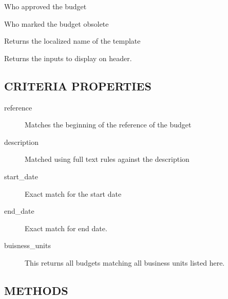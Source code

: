 \begin{description}
\begin{description}
\begin{description}
\begin{description}
\begin{description}
\begin{description}
\begin{description}
\begin{description}
\begin{description}
\begin{description}
\begin{description}
\begin{description}
Who approved the budget


\item[{obsolete\_by\_name}] \mbox{}

Who marked the budget obsolete

\end{description}

\item[{name}] \mbox{}

Returns the localized name of the template


\item[{header\_lines}] \mbox{}

Returns the inputs to display on header.

\end{description}
\subsection*{CRITERIA PROPERTIES\label{LedgerSMB::DBObject::Reports::Budget::Search_CRITERIA_PROPERTIES}}
\begin{description}

\item[{reference}] \mbox{}

Matches the beginning of the reference of the budget


\item[{description}] \mbox{}

Matched using full text rules against the description


\item[{start\_date}] \mbox{}

Exact match for the start date


\item[{end\_date}] \mbox{}

Exact match for end date.


\item[{buisness\_units}] \mbox{}

This returns all budgets matching all business units listed here.

\end{description}
\subsection*{METHODS\label{LedgerSMB::DBObject::Reports::Budget::Search_METHODS}}
\begin{description}


\end{description}
\end{description}
\end{description}
\end{description}
\end{description}
\end{description}
\end{description}
\end{description}
\end{description}
\end{description}
\end{description}
